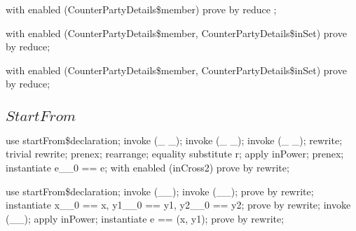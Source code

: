 \begin{LPScript}\begin{zproof}[fCounterPartyDetailsNextSeqNoLowerBound]
   with enabled (CounterPartyDetails\$member) prove by reduce ;
\end{zproof}\end{LPScript}

\begin{LPScript}\begin{zproof}[fCounterPartyDetailsMember]
    with enabled (CounterPartyDetails\$member,
                    CounterPartyDetails\$inSet) prove by reduce;
\end{zproof}\end{LPScript}

\begin{LPScript}\begin{zproof}[fCounterPartyDetailsInSetMember]
    with enabled (CounterPartyDetails\$member,
                    CounterPartyDetails\$inSet) prove by reduce;
\end{zproof}\end{LPScript}

\subsection{$StartFrom$}

\begin{LPScript}\begin{zproof}[gMESSAGEStartFromRelType]
    use startFrom\$declaration;
    invoke (\_ \fun \_);
    invoke (\_ \pfun \_);
    invoke (\_ \rel \_);
    rewrite;
    trivial rewrite;
    prenex;
    rearrange;
    equality substitute r;
    apply inPower;
    prenex;
    instantiate e\_\_0 == e;
    with enabled (inCross2) prove by rewrite;
\end{zproof}\end{LPScript}

\begin{LPScript}\begin{zproof}[gMESSAGEStartFromPFunType]
    use startFrom\$declaration;
    invoke (\_\fun \_);
    invoke (\_\pfun \_);
    prove by rewrite;
    instantiate x\_\_0 == x, y1\_\_0 == y1, y2\_\_0 == y2;
    prove by rewrite;
    invoke (\_\rel\_);
    apply inPower;
    instantiate e == (x, y1);
    prove by rewrite;
\end{zproof}\end{LPScript}

